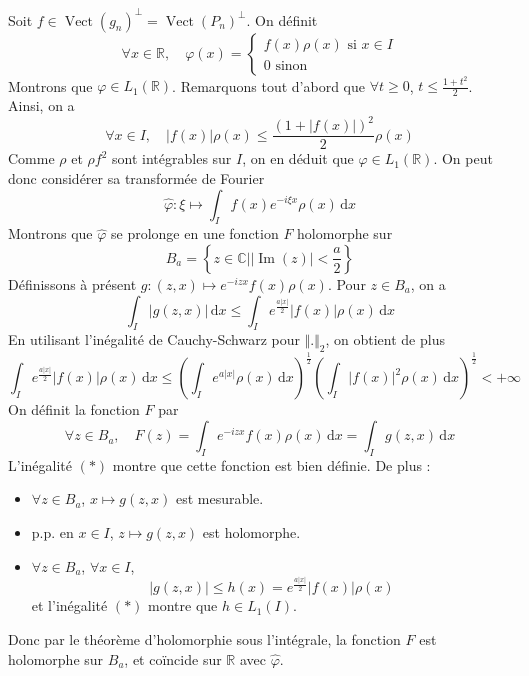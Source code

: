	\begin{demonstration}
		Soit $f \in \operatorname{Vect}(g_n)^\perp = \operatorname{Vect}(P_n)^\perp$. On définit
		\[
		\forall x \in \mathbb{R}, \quad \varphi(x) = \begin{cases} f(x) \rho(x) \text{ si } x \in I \\ 0 \text{ sinon} \end{cases}
		\]
		Montrons que $\varphi \in L_1(\mathbb{R})$. Remarquons tout d'abord que $\forall t \geq 0$, $t \leq \frac{1 + t^2}{2}$. Ainsi, on a
		\[ \forall x \in I, \quad |f(x)|\rho(x) \leq \frac{(1 + |f(x)|)^2}{2} \rho(x) \]
		Comme $\rho$ et $\rho f^2$ sont intégrables sur $I$, on en déduit que $\varphi \in L_1(\mathbb{R})$. On peut donc considérer sa transformée de Fourier
		\[ \hat{\varphi} : \xi \mapsto \int_I f(x) e^{-i \xi x} \rho(x) \, \mathrm{d}x \]
		Montrons que $\hat{\varphi}$ se prolonge en une fonction $F$ holomorphe sur
		\[ B_a = \left\{ z \in \mathbb{C} \mid \vert \operatorname{Im}(z) \vert < \frac{a}{2} \right\} \]
		Définissons à présent $g : (z, x) \mapsto e^{-izx} f(x) \rho(x)$. Pour $z \in B_a$, on a
		\[ \int_I \vert g(z, x) \vert \, \mathrm{d}x \leq \int_I e^{\frac{a \vert x \vert}{2}} \vert f(x) \vert \rho(x) \, \mathrm{d}x \]
		En utilisant l'inégalité de Cauchy-Schwarz pour $\Vert . \Vert_2$, on obtient de plus
		\[ \int_I e^{\frac{a \vert x \vert}{2}} \vert f(x) \vert \rho(x) \, \mathrm{d}x \leq \left( \int_I e^{a \vert x \vert} \rho(x) \, \mathrm{d}x \right)^{\frac{1}{2}} \left( \int_I \vert f(x) \vert^2 \rho(x) \, \mathrm{d}x \right)^{\frac{1}{2}} < + \infty \tag{$*$} \]
		On définit la fonction $F$ par
		\[ \forall z \in B_a , \quad F(z) = \int_I e^{-izx} f(x) \rho(x) \, \mathrm{d}x = \int_I g(z, x) \, \mathrm{d}x \]
		L'inégalité $(*)$ montre que cette fonction est bien définie. De plus :
		\begin{itemize}
			\item $\forall z \in B_a$, $x \mapsto g(z, x)$ est mesurable.
			\item p.p. en $x \in I$, $z \mapsto g(z, x)$ est holomorphe.
			\item $\forall z \in B_a$, $\forall x \in I$,
			\[ \vert g(z, x) \vert \leq h(x) = e^{\frac{a \vert x \vert}{2}} \vert f(x) \vert \rho(x) \]
			et l'inégalité $(*)$ montre que $h \in L_1(I)$.
		\end{itemize}
		Donc par le théorème d'holomorphie sous l'intégrale, la fonction $F$ est holomorphe sur $B_a$, et coïncide sur $\mathbb{R}$ avec $\hat{\varphi}$.

\end{demonstration}
